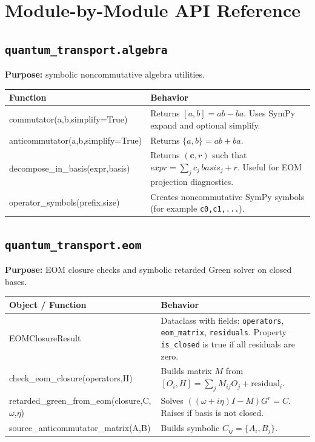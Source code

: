 \documentclass[11pt,a4paper]{article}
\begin{document}
\section{Module-by-Module API Reference}
\subsection{\texttt{quantum\_transport.algebra}}
\textbf{Purpose:} symbolic noncommutative algebra utilities.

\begin{longtable}{>{\ttfamily}p{} p{}}
\toprule
Function & Behavior \\
\midrule
\endhead
commutator(a,b,simplify=True) & Returns \([a,b]=ab-ba\). Uses SymPy expand and optional simplify. \\
anticommutator(a,b,simplify=True) & Returns \(\{a,b\}=ab+ba\). \\
decompose\_in\_basis(expr,basis) & Returns \((\mathbf{c}, r)\) such that \(expr=\sum_j c_j\,basis_j + r\). Useful for EOM projection diagnostics. \\
operator\_symbols(prefix,size) & Creates noncommutative SymPy symbols (for example \texttt{c0,c1,...}). \\
\bottomrule
\end{longtable}

\subsection{\texttt{quantum\_transport.eom}}
\textbf{Purpose:} EOM closure checks and symbolic retarded Green solver on closed bases.

\begin{longtable}{>{\ttfamily}p{} p{}}
\toprule
Object / Function & Behavior \\
\midrule
\endhead
EOMClosureResult & Dataclass with fields: \texttt{operators}, \texttt{eom\_matrix}, \texttt{residuals}. Property \texttt{is\_closed} is true if all residuals are zero. \\
check\_eom\_closure(operators,H) & Builds matrix \(M\) from \([O_i,H]=\sum_j M_{ij}O_j+\mathrm{residual}_i\). \\
retarded\_green\_from\_eom(closure,C,\(\omega\),\(\eta\)) & Solves \(((\omega+i\eta)I-M)G^r=C\). Raises if basis is not closed. \\
source\_anticommutator\_matrix(A,B) & Builds symbolic \(C_{ij}=\{A_i,B_j\}\). \\
\bottomrule
\end{longtable}
\end{document}
